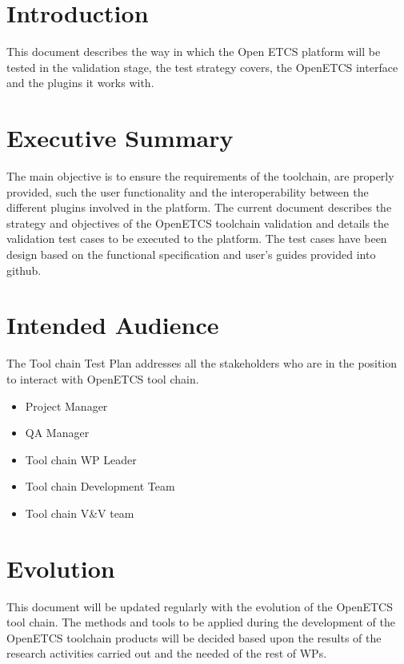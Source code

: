 \section{Introduction}
\label{sec:Introduction}


This document describes the way in which the Open ETCS platform will be tested in the validation stage, the test strategy covers, the OpenETCS interface and the plugins it works with.

\section{Executive Summary}
\label{sec-1-2}
The main objective is to ensure the requirements of the toolchain, are properly provided, such the user functionality and the interoperability between the different plugins involved in the platform.
The current document describes the strategy and objectives of the OpenETCS toolchain validation and details the validation test cases to be executed to the platform. The test cases have been design based on the functional specification and user’s guides provided into github.

\section{Intended Audience}
\label{sec-1-3}

The Tool chain Test Plan addresses all the stakeholders who are in the position to interact with OpenETCS tool chain.

\begin{itemize}
\item Project Manager
\item QA Manager
\item Tool chain WP Leader
\item Tool chain Development Team
\item Tool chain V\&V team
\end{itemize}

\section{Evolution}

This document will be updated regularly with the evolution of the OpenETCS tool chain. The methods and tools to be applied during the development of the OpenETCS toolchain products will be decided based upon the results of the research activities carried out and the needed of the rest of WPs. 

